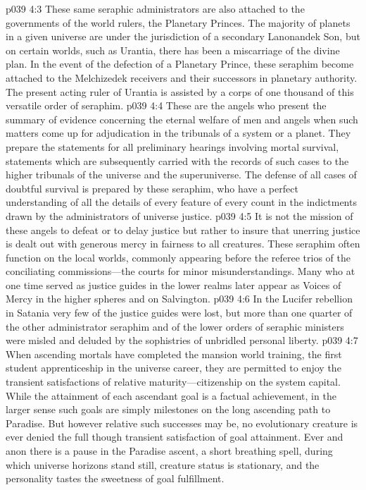 \vs p039 4:3 These same seraphic administrators are also attached to the governments of the world rulers, the Planetary Princes. The majority of planets in a given universe are under the jurisdiction of a secondary Lanonandek Son, but on certain worlds, such as Urantia, there has been a miscarriage of the divine plan. In the event of the defection of a Planetary Prince, these seraphim become attached to the Melchizedek receivers and their successors in planetary authority. The present acting ruler of Urantia is assisted by a corps of one thousand of this versatile order of seraphim.
\pc \vs p039 4:4 \bibnobreakspace {} These are the angels who present the summary of evidence concerning the eternal welfare of men and angels when such matters come up for adjudication in the tribunals of a system or a planet. They prepare the statements for all preliminary hearings involving mortal survival, statements which are subsequently carried with the records of such cases to the higher tribunals of the universe and the superuniverse. The defense of all cases of doubtful survival is prepared by these seraphim, who have a perfect understanding of all the details of every feature of every count in the indictments drawn by the administrators of universe justice.
\vs p039 4:5 It is not the mission of these angels to defeat or to delay justice but rather to insure that unerring justice is dealt out with generous mercy in fairness to all creatures. These seraphim often function on the local worlds, commonly appearing before the referee trios of the conciliating commissions---the courts for minor misunderstandings. Many who at one time served as justice guides in the lower realms later appear as Voices of Mercy in the higher spheres and on Salvington.
\vs p039 4:6 In the Lucifer rebellion in Satania very few of the justice guides were lost, but more than one quarter of the other administrator seraphim and of the lower orders of seraphic ministers were misled and deluded by the sophistries of unbridled personal liberty.
\pc \vs p039 4:7 \bibnobreakspace {} When ascending mortals have completed the mansion world training, the first student apprenticeship in the universe career, they are permitted to enjoy the transient satisfactions of relative maturity---citizenship on the system capital. While the attainment of each ascendant goal is a factual achievement, in the larger sense such goals are simply milestones on the long ascending path to Paradise. But however relative such successes may be, no evolutionary creature is ever denied the full though transient satisfaction of goal attainment. Ever and anon there is a pause in the Paradise ascent, a short breathing spell, during which universe horizons stand still, creature status is stationary, and the personality tastes the sweetness of goal fulfillment.
